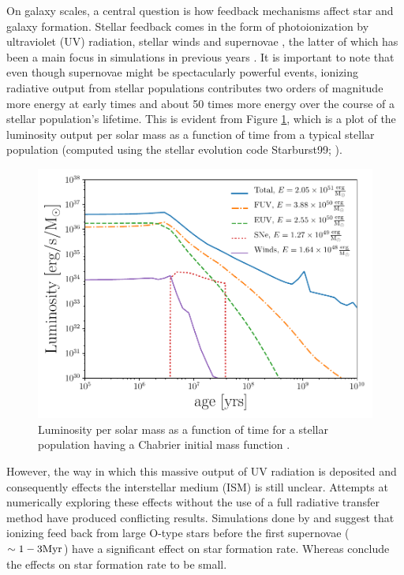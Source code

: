 \documentclass[fleq,usenatbib]{mnras}
\begin{document}
On galaxy scales, a central question is how feedback mechanisms affect star 
and galaxy formation. Stellar feedback comes in the form of photoionization by 
ultraviolet (UV) radiation, stellar winds and supernovae 
\citep{leithererEt99}, the latter of which has been a main focus in 
simulations in previous years \citep[e.g.][]{agertzEt13}. It is important to note that 
even though supernovae might be spectacularly powerful events, ionizing 
radiative output from stellar populations contributes two orders of magnitude 
more energy at early times and about 50 times more energy over the course of a 
stellar population's lifetime. This is evident from Figure \ref{fig:uvsn},
which is a plot of the luminosity output per solar mass as a function of time 
from a typical stellar population (computed using the stellar evolution code 
Starburst99; \citealt{leithererEt99}).
\begin{figure}
\includegraphics[width=1\linewidth]{Figures/uvsn.pdf}
\caption{Luminosity per solar mass as a function of time for a stellar 
population having a Chabrier initial mass function \citep{chabrier03}.}
\label{fig:uvsn}
\end{figure}

However, the way in which this massive output of UV radiation is deposited 
and consequently effects the interstellar medium (ISM) is still unclear. 
Attempts at numerically exploring these effects without the use of a full 
radiative transfer method have produced conflicting results. Simulations done
by \cite{gritschnederEt09} and \cite{walchEt12} suggest that ionizing feed 
back from large O-type stars before the first supernovae ($\sim 1-3\rm{Myr}$) have a significant effect on star formation rate. Whereas \cite{daleEt12} 
conclude the effects on star formation rate to be small.
\end{document}
